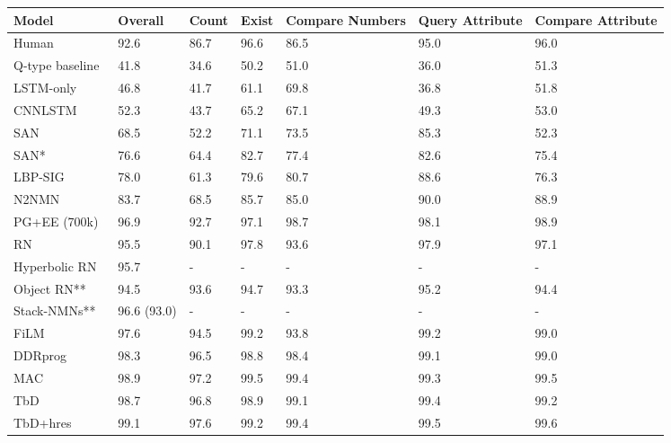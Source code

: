 \begin{table}
\centering
\begin{threeparttable}
\begin{tabular}{l | C{14mm} | C{10mm} C{10mm} C{14mm} C{14mm} C{14mm}}
\toprule
Model & \textbf{Overall} & Count & Exist & Compare Numbers & Query Attribute & Compare Attribute \\
\hline
Human~\cite{johnson2017clevr}  & 92.6 & 86.7 & 96.6 & 86.5 & 95.0 & 96.0 \\
\hline
Q-type baseline~\cite{johnson2017clevr,antol2015vqa}  & 41.8 & 34.6 & 50.2 & 51.0 & 36.0 & 51.3  \\
LSTM-only~\cite{johnson2017clevr,ren2015image,antol2015vqa,gao2015you,malinowski2015ask} & 46.8 & 41.7 & 61.1 & 69.8 & 36.8 & 51.8  \\
CNNLSTM~\cite{johnson2017clevr,ren2015image,antol2015vqa,gao2015you,malinowski2015ask}  & 52.3 & 43.7 & 65.2 & 67.1 & 49.3 & 53.0  \\
SAN~\cite{johnson2017clevr,yang2015stacked}       & 68.5 & 52.2 & 71.1 & 73.5 & 85.3 & 52.3  \\
SAN*~\cite{santoro2017simple,yang2015stacked}     & 76.6 & 64.4 & 82.7 & 77.4 & 82.6 & 75.4  \\
LBP-SIG~\cite{chen2017sva}  & 78.0 & 61.3 & 79.6 & 80.7 & 88.6 & 76.3  \\
N2NMN~\cite{hu2017learning}  & 83.7 & 68.5 & 85.7 & 85.0 & 90.0 & 88.9 \\
PG+EE (700k)~\cite{johnson2017inferring} & 96.9 & 92.7 & 97.1 & 98.7 & 98.1 & 98.9 \\
RN~\cite{santoro2017simple} & 95.5 & 90.1 & 97.8 & 93.6 & 97.9 & 97.1 \\
Hyperbolic RN~\cite{gulcehre2018hyperbolic} & 95.7 & - & - & - & - & - \\
Object RN**~\cite{desta2018object} & 94.5 & 93.6 & 94.7 & 93.3 & 95.2 & 94.4 \\
Stack-NMNs**~\cite{explainable2018eccv} & 96.6 (93.0) & - & - & - & - & - \\
FiLM~\cite{perez2017film} & 97.6 & 94.5 & 99.2 & 93.8 & 99.2 & 99.0 \\
DDRprog~\cite{suarez2018ddrprog} & 98.3 & 96.5 & 98.8 & 98.4 & 99.1 & 99.0 \\
MAC~\cite{hudson2018compositional} & 98.9 & 97.2 & 99.5 & 99.4 & 99.3 & 99.5 \\
TbD~\cite{mascharka2018transparency} & 98.7 & 96.8 & 98.9 & 99.1 & 99.4 & 99.2 \\
TbD+hres~\cite{mascharka2018transparency} & 99.1 & 97.6 & 99.2 & 99.4 & 99.5 & 99.6 \\

\end{tabular}
\end{threeparttable}
\end{table}
